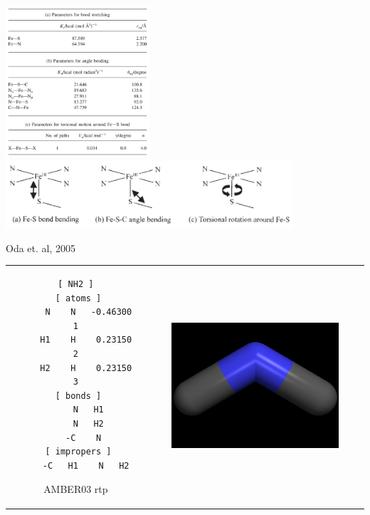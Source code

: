 \documentclass{beamer}
\begin{document}

\begin{frame}
\begin{center}
\includegraphics[width=0.4\textwidth]{images/iron_params} \\
\includegraphics[width=0.8\textwidth]{images/iron_diags}
\end{center}
{\footnotesize Oda et. al, 2005}
\end{frame}


\begin{frame}[fragile]
\begin{tabular}{cc}
\begin{minipage}{0.5\textwidth}
{\scriptsize
\begin{verbatim}
[ NH2 ]
 [ atoms ]
     N    N   -0.46300    1
    H1    H    0.23150    2
    H2    H    0.23150    3
 [ bonds ]
     N   H1
     N   H2
    -C    N 
 [ impropers ]
    -C   H1    N   H2
\end{verbatim}
}
{\footnotesize AMBER03 rtp}
\end{minipage}
&
\begin{minipage}{0.5\textwidth}
\includegraphics[width=0.8\textwidth]{images/amidogen}
\end{minipage}
\end{tabular}
\end{frame}
\end{document}
